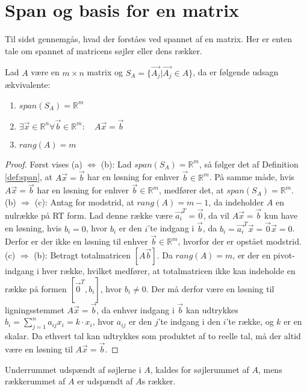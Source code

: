 \section{Span og basis for en matrix}
Til sidst gennemgås, hvad der forståes ved spannet af en matrix.
Her er enten tale om spannet af matricens søjler eller dens rækker.
\begin{stn}
Lad $A$ være en $m\times n$ matrix og $S_A= \{\vec{A_j}| \vec{ A_j}\in A\}$, da er følgende udsagn ækvivalente:
\begin{enumerate}[label=\alph*]
\item $span(S_A) = \mathds{R}^m$
\item $\exists \vec{x} \in \mathds{R}^n \forall \vec{b} \in \mathds{R}^m: \quad A\vec{x}=\vec{b}$
\item $rang(A) = m$
\end{enumerate}
\end{stn}
\begin{proof}
Først vises (a) $\Leftrightarrow$ (b):
Lad $span(S_A) = \mathds{R}^m$, så følger det af Definition \ref{def:span}, at $A\vec{x}= \vec{b}$ har en løsning for enhver $\vec{b} \in \mathds{R}^m$.
På samme måde, hvis $A\vec{x}= \vec{b}$ har en løsning for enhver $\vec{b} \in \mathds{R}^m$, medfører det, at $span(S_A) = \mathds{R}^m$. 
\\(b) $\Rightarrow$ (c):
Antag for modstrid, at $rang(A) = m-1$, da indeholder $A$ en nulrække på RT form. 
Lad denne række være $\vec{a_i}^T = \vec{0}$, da vil $A\vec{x} = \vec{b}$ kun have en løsning, hvis $b_i=0$, hvor $b_i$ er den $i$'te indgang i $\vec{b}$, da $b_i = \vec{a_i}^T \vec{x} = \vec{0} \vec{x} = 0$. 
Derfor er der ikke en løsning til enhver $\vec{b} \in \mathds{R}^m$, hvorfor der er opstået modstrid.
\\(c) $\Rightarrow$ (b): 
Betragt totalmatricen $[A \vec{b}]$. 
Da $rang(A) = m$, er der en pivot-indgang i hver række,
hvilket medfører, at totalmatricen ikke kan indeholde en række på formen $[\vec{0}^T, b_i]$, hvor $b_i \neq 0$.
Der må derfor være en løsning til ligningsstemmet $A\vec{x} = \vec{b}$, da enhver indgang i $\vec{b}$ kan udtrykkes $b_i = \sum_{j=1}^n a_{ij} x_i = k \cdot x_i$, hvor $a_{ij}$ er den $j$'te indgang i den $i$'te række, og $k$ er en skalar.
Da ethvert tal kan udtrykkes som produktet af to reelle tal, må der altid være en løsning til $A\vec{x}=\vec{b}$.
\end{proof}
Underrummet udspændt af søjlerne i $A$, kaldes for søjlerummet af $A$, mens rækkerummet af $A$ er udspændt af $A$s rækker.
